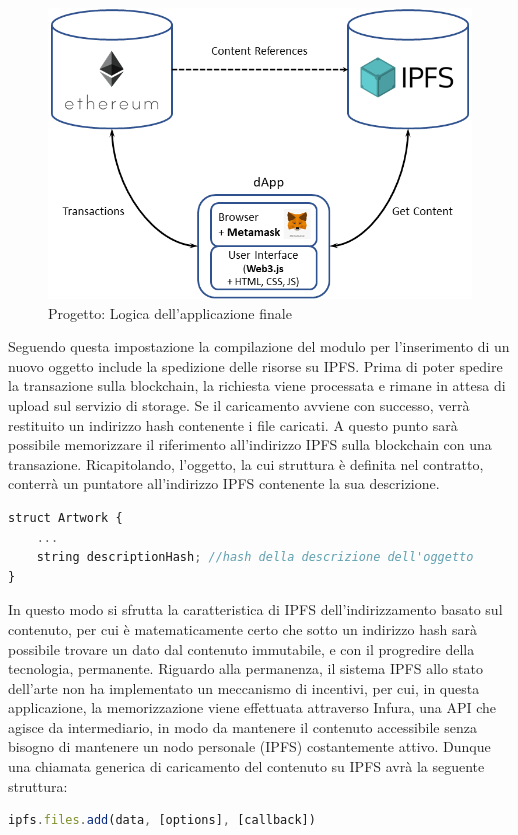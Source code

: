 \begin{figure}[H]
\centering
\includegraphics[width=1\textwidth]{immagini/ipfsIntegration.png}
\caption{Progetto: Logica dell'applicazione finale}
\label{fig:dapp}
\end{figure}

Seguendo questa impostazione la compilazione del modulo per l’inserimento di un nuovo oggetto include la spedizione delle risorse su IPFS. Prima di poter spedire la transazione sulla blockchain, la richiesta viene processata e rimane in attesa di upload sul servizio di storage. Se il caricamento avviene con successo, verrà restituito un indirizzo hash contenente i file caricati. A questo punto sarà possibile memorizzare il riferimento all'indirizzo IPFS sulla blockchain con una transazione. Ricapitolando, l'oggetto, la cui struttura è definita nel contratto, conterrà un puntatore all'indirizzo IPFS contenente la sua descrizione.
\\
\begin{lstlisting}[caption={Riferimento all'indirizzo hash di IPFS},language=JavaScript]
struct Artwork {
    ...
    string descriptionHash; //hash della descrizione dell'oggetto 
}
\end{lstlisting}

In questo modo si sfrutta la caratteristica di IPFS dell'indirizzamento basato sul contenuto, per cui è matematicamente certo che sotto un indirizzo hash sarà possibile trovare un dato dal contenuto immutabile, e con il progredire della tecnologia, permanente. Riguardo alla permanenza, il sistema IPFS allo stato dell'arte non ha implementato un meccanismo di incentivi, per cui, in questa applicazione, la memorizzazione viene effettuata attraverso Infura, una API che agisce da intermediario, in modo da mantenere il contenuto accessibile senza bisogno di mantenere un nodo personale (IPFS) costantemente attivo. Dunque una chiamata generica di caricamento del contenuto su IPFS avrà la seguente struttura:
\\
\begin{lstlisting}[caption={Aggiunta di file con IPFS Javascript API},language=JavaScript]
ipfs.files.add(data, [options], [callback])
\end{lstlisting}

